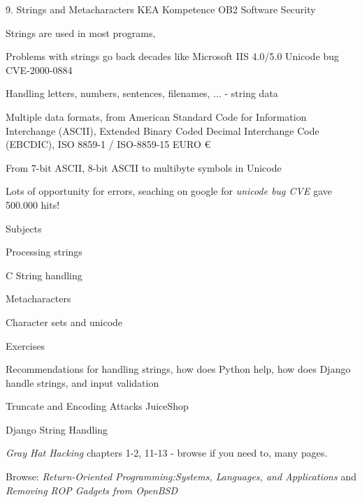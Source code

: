 \documentclass[Screen16to9,17pt]{foils}
\begin{document}
\mytitlepage
{9. Strings and Metacharacters}
{KEA Kompetence OB2 Software Security}



\begin{list1}
\item Strings are used in most programs,
\item Problems with strings go back decades like Microsoft IIS 4.0/5.0 Unicode bug CVE-2000-0884
\item Handling letters, numbers, sentences, filenames, ... - string data
\item Multiple data formats, from American Standard Code for Information Interchange (ASCII), Extended Binary Coded Decimal Interchange Code (EBCDIC), ISO 8859-1 / ISO-8859-15 EURO €
\item From 7-bit ASCII, 8-bit ASCII to multibyte symbols in Unicode
\item Lots of opportunity for errors, seaching on google for \emph{unicode bug CVE} gave 500.000 hits!
\end{list1}


\begin{list1}
\item Subjects
\begin{list2}
\item Processing strings
\item C String handling
\item Metacharacters
\item Character sets and unicode
\end{list2}
\item Exercises
\begin{list2}
\item Recommendations for handling strings, how does Python help, how does Django handle strings, and input validation
\item Truncate and Encoding Attacks JuiceShop
\item Django String Handling
\end{list2}
\end{list1}


\begin{list1}
\item \emph{Gray Hat Hacking} chapters 1-2, 11-13 - browse if you need to, many pages.
\item Browse: \emph{Return-Oriented Programming:Systems, Languages, and Applications} and \emph{Removing ROP Gadgets from OpenBSD}
\end{list1}
\end{document}
